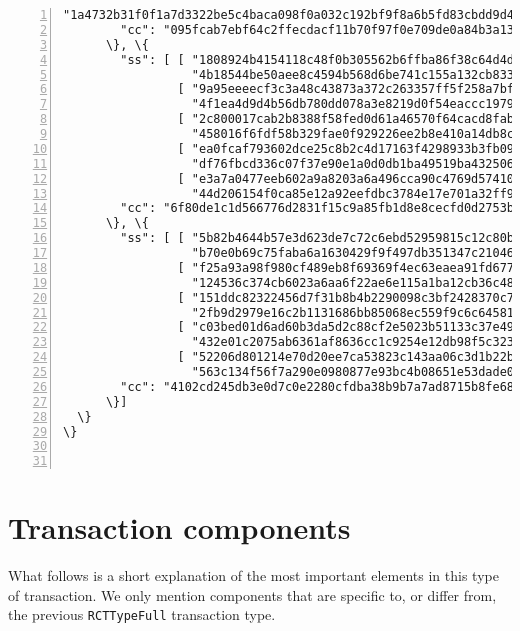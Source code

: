 \begin{appendices}
\begin{Verbatim}[commandchars=\\\{\}, numbers=left]
                  "1a4732b31f0f1a7d3322be5c4baca098f0a032c192bf9f8a6b5fd83cbdd9d401"]], 
        "cc": "095fcab7ebf64c2ffecdacf11b70f97f0e709de0a84b3a13abca627f9df2c901"
      \}, \{
        "ss": [ [ "1808924b4154118c48f0b305562b6ffba86f38c64d4d8a087823f3383cddd006", 
                  "4b18544be50aee8c4594b568d6be741c155a132cb83392d9b1a4cf35c3d5760c"], 
                [ "9a95eeeecf3c3a48c43873a372c263357ff5f258a7bf8ed29a767237b0b0f202", 
                  "4f1ea4d9d4b56db780dd078a3e8219d0f54eaccc197901671002a206f063cb0e"], 
                [ "2c800017cab2b8388f58fed0d61a46570f64cacd8fabc4e84ddee735b3135f0a", 
                  "458016f6fdf58b329fae0f929226ee2b8e410a14db8c6ede9b74fb718de71507"], 
                [ "ea0fcaf793602dce25c8b2c4d17163f4298933b3fb09874307d8cde9a63c2c0c", 
                  "df76fbcd336c07f37e90e1a0d0db1ba49519ba4325062228bc9242af2c525703"], 
                [ "e3a7a0477eeb602a9a8203a6a496cca90c4769d57410246c4c8d665df34df900", 
                  "44d206154f0ca85e12a92eefdbc3784e17e701a32ff93b550467679f67500c0d"]], 
        "cc": "6f80de1c1d566776d2831f15c9a85fb1d8e8cecfd0d2753b318f0e84d89d3b08"
      \}, \{
        "ss": [ [ "5b82b4644b57e3d623de7c72c6ebd52959815c12c80b479e4cbe5437cf67640c", 
                  "b70e0b69c75faba6a1630429f9f497db351347c210467f69e1b1c5f1a72afe02"], 
                [ "f25a93a98f980cf489eb8f69369f4ec63eaea91fd677decab9b6ca0fe2feb606", 
                  "124536c374cb6023a6aa6f22ae6e115a1ba12cb36c48f5f5ad43ce90f471da02"], 
                [ "151ddc82322456d7f31b8b4b2290098c3bf2428370c7ef325660b5463ff26404", 
                  "2fb9d2979e16c2b1131686bb85068ec559f9c6c64581e609b451bb2cd9d5740d"], 
                [ "c03bed01d6ad60b3da5d2c88cf2e5023b51133c37e4917511715a11f09d8740d", 
                  "432e01c2075ab6361af8636cc1c9254e12db98f5c323088792dfb42a1c894401"], 
                [ "52206d801214e70d20ee7ca53823c143aa06c3d1b22b118cc8a15c9f861f0102", 
                  "563c134f56f7a290e0980877e93bc4b08651e53dade079b1e6c066b70fb81406"]], 
        "cc": "4102cd245db3e0d7c0e2280cfdba38b9b7a7ad8715b8fe68c1170cf923b3d70d"
      \}]
  \}
\}



\end{Verbatim}


\section*{Transaction components}

What follows is a short explanation of the most important elements in this type of transaction. We only mention components that are specific to, or differ from, the previous {\tt RCTTypeFull} transaction type.



\end{appendices}
